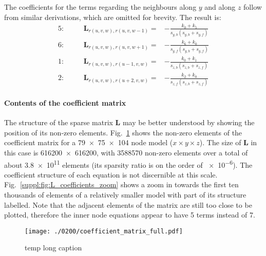 The coefficients for the terms regarding the neighbours along $y$ and along $z$ follow from similar derivations, which are omitted for brevity.
The result is:
\begin{align}
    \label{suppl:eq:L_coefficients_y_z_terms}
    5: &&\quad \bm{L}_{r(u,v,w),r(u,v,w-1)} = & - \frac{k_0 + k_5}{s_{y,b} (s_{y,b} + s_{y,f})} \\[2ex]
    6: &&\quad \bm{L}_{r(u,v,w),r(u,v,w+1)} = & - \frac{k_6 + k_0}{s_{y,f} (s_{y,b} + s_{y,f})} \\[2ex]
    1: &&\quad \bm{L}_{r(u,v,w),r(u-1,v,w)} = & - \frac{k_0 + k_1}{s_{z,b} (s_{z,b} + s_{z,f})} \\[2ex]
    2: &&\quad \bm{L}_{r(u,v,w),r(u+2,v,w)} = & - \frac{k_2 + k_0}{s_{z,f} (s_{z,b} + s_{z,f})}
\end{align}

\FloatBarrier

\paragraph*{Contents of the coefficient matrix}
The structure of the sparse matrix $\bm{L}$ may be better understood by showing the position of its non-zero elements.
Fig.~\ref{suppl:fig:L_coefficients_full} shows the non-zero elements of the coefficient matrix for a \num{79}~$\times$~\num{75}~$\times$~\num{104} node model ($x \times y \times z$).
The size of $\bm{L}$ in this case is \num{616200}~$\times$~\num{616200}, with \num{3588570} non-zero elements over a total of about \num{3.8e11} elements (its sparsity ratio is on the order of \num{e-6}).
The coefficient structure of each equation is not discernible at this scale.
Fig.~\ref{suppl:fig:L_coefficients_zoom} shows a zoom in towards the first ten thousands of elements of a relatively smaller model with part of its structure labelled.
Note that the adjacent elements of the matrix are still too close to be plotted, therefore the inner node equations appear to have \num{5} terms instead of \num{7}.


\begin{figure}
    \begin{adjustbox}{center}
        \texttt{[image: ./0200/coefficient\_matrix\_full.pdf]}
    \end{adjustbox}
    \caption[temp short caption]{temp long caption}
    \label{suppl:fig:L_coefficients_full}
\end{figure}


